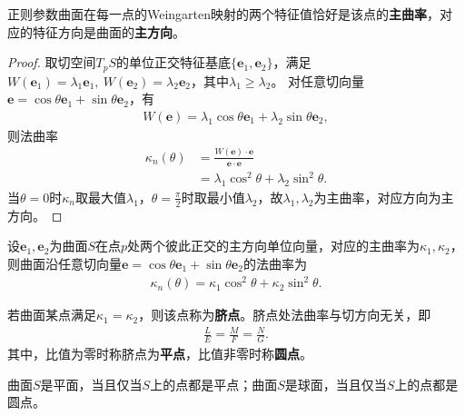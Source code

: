 \documentclass[../../main.tex]{subfiles}%
\begin{document}
\begin{theorem}
正则参数曲面在每一点的Weingarten映射的两个特征值恰好是该点的\textbf{主曲率}，对应的特征方向是曲面的\textbf{主方向}。
\end{theorem}
\begin{proof}

取切空间$T_pS$的单位正交特征基底$\{\boldsymbol{e}_1,\boldsymbol{e}_2\}$，满足$W(\boldsymbol{e}_1)=\lambda_1\boldsymbol{e}_1,\ W(\boldsymbol{e}_2)=\lambda_2\boldsymbol{e}_2$，其中$\lambda_1\geqslant\lambda_2$。
对任意切向量$\boldsymbol{e}=\cos\theta\boldsymbol{e}_1+\sin\theta\boldsymbol{e}_2$，有
\begin{align*}
W(\boldsymbol{e})=\lambda_1\cos\theta\boldsymbol{e}_1+\lambda_2\sin\theta\boldsymbol{e}_2,
\end{align*}
则法曲率
\begin{align*}
\kappa_n(\theta)&=\frac{W(\boldsymbol{e})\cdot\boldsymbol{e}}{\boldsymbol{e}\cdot\boldsymbol{e}}\\
&=\lambda_1\cos^2\theta+\lambda_2\sin^2\theta.
\end{align*}
当$\theta=0$时$\kappa_n$取最大值$\lambda_1$，$\theta=\frac{\pi}{2}$时取最小值$\lambda_2$，故$\lambda_1,\lambda_2$为主曲率，对应方向为主方向。

\end{proof}

\begin{theorem}[Euler公式]
设$\boldsymbol{e}_1,\boldsymbol{e}_2$为曲面$S$在点$p$处两个彼此正交的主方向单位向量，对应的主曲率为$\kappa_1,\kappa_2$，则曲面沿任意切向量$\boldsymbol{e}=\cos\theta\boldsymbol{e}_1+\sin\theta\boldsymbol{e}_2$的法曲率为
\begin{align}
\kappa_n(\theta)=\kappa_1\cos^2\theta+\kappa_2\sin^2\theta.\label{eq:euler_formula}
\end{align}
\end{theorem}

\begin{definition}
若曲面某点满足$\kappa_1=\kappa_2$，则该点称为\textbf{脐点}。脐点处法曲率与切方向无关，即
\begin{align}
\frac{L}{E}=\frac{M}{F}=\frac{N}{G}.\label{eq:umbilical_point}
\end{align}
其中，比值为零时称脐点为\textbf{平点}，比值非零时称\textbf{圆点}。
\end{definition}

\begin{proposition}
曲面$S$是平面，当且仅当$S$上的点都是平点；曲面$S$是球面，当且仅当$S$上的点都是圆点。
\end{proposition}
\end{document}
